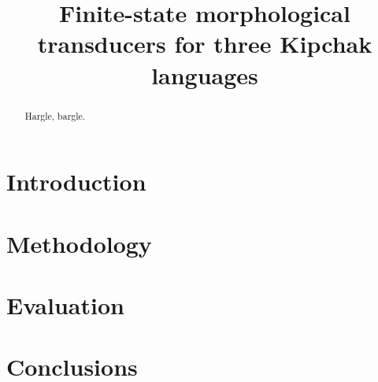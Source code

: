 
\usepackage{fontspec}
\usepackage{xunicode}
\usepackage{xltxtra}


\title{Finite-state morphological transducers for three Kipchak languages}



\maketitle

\begin{abstract}
Hargle, bargle.
\end{abstract}

\section{Introduction}

\section{Methodology}

\section{Evaluation}

\section{Conclusions}


